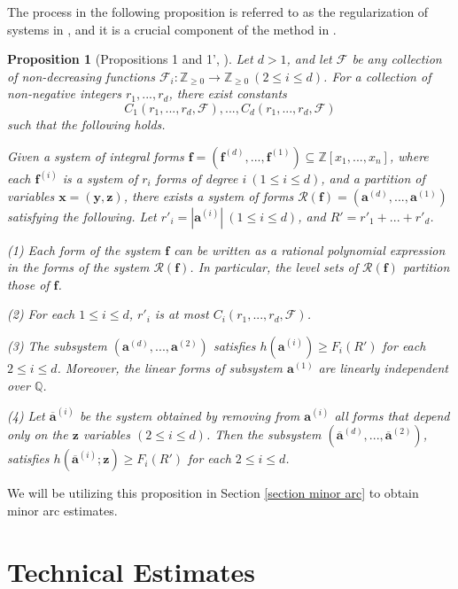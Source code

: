 \documentclass[12pt]{amsart}
\newtheorem{prop}[thm]{Proposition}
\theoremstyle{definition}
\theoremstyle{remark}
\numberwithin{equation}{section}
\begin{document}
The process in the following proposition is referred to as the regularization of systems in \cite{CM}, and it
is a crucial component of the method in \cite{CM}. 
\begin{prop}[Propositions 1 and 1', \cite{CM}]
\label{prop reg par}
Let $d>1$, and let $\boldsymbol{\mathcal{F}}$ be any collection of non-decreasing functions $\mathcal{F}_i: \mathbb{Z}_{\geq 0} \rightarrow \mathbb{Z}_{\geq 0} \ (2 \leq i \leq d)$. For a collection of non-negative integers $r_1, ..., r_d$, there exist constants
$$
C_1(r_1, ..., r_d, \boldsymbol{\mathcal{F}} ), ... , C_d(r_1, ..., r_d,  \boldsymbol{\mathcal{F}} )
$$
such that the following holds.

Given a system of integral forms $\mathbf{f} = ({\mathbf{f}}^{(d)}, ..., {\mathbf{f}}^{(1)}) \subseteq \mathbb{Z}[x_1, ..., x_n]$, where each
$\mathbf{f}^{(i)}$ is a system of $r_i$ forms of degree $i \ (1 \leq i \leq d)$, and a partition of variables $\mathbf{x} = (\mathbf{y}, \mathbf{z})$, there exists a system of forms
$\mathcal{R}( \mathbf{f}) = ({\mathbf{a}}^{(d)}, ..., {\mathbf{a}}^{(1)})$ satisfying the following.
Let $r'_i = |\mathbf{a}^{(i)}| \ (1 \leq i \leq d)$, and $R' = r'_1 + ... + r'_d$.
\newline

(1) Each form of the system $\mathbf{f}$ can be written as a rational polynomial expression in the forms of the system $\mathcal{R}( \mathbf{f})$.
In particular, the level sets of $\mathcal{R}( \mathbf{f})$ partition those of $\mathbf{f}$.

(2) For each $1 \leq i \leq d$, $r'_i$ is at most $C_i(r_1, ..., r_d, \boldsymbol{\mathcal{F}})$.

(3) The subsystem $({\mathbf{a}}^{(d)}, ..., { \mathbf{a} }^{(2)})$ satisfies $h({\mathbf{a}}^{(i)}) \geq F_i(R')$ for each $2 \leq i \leq d$. Moreover, the linear forms of subsystem ${ \mathbf{a} }^{(1)}$ are linearly independent over $\mathbb{Q}$.

(4) Let $\overline{\mathbf{a}}^{(i)}$ be the system obtained by removing from ${\mathbf{a}}^{(i)}$ all forms that depend only
on the $\mathbf{z}$ variables $(2 \leq i \leq d)$. Then the subsystem $({ \overline{\mathbf{a}}}^{(d)}, ..., { \overline{\mathbf{a}} }^{(2)})$,
satisfies $h({\overline{\mathbf{a}} }^{(i)} ; \mathbf{z}) \geq F_i(R')$ for each $2 \leq i \leq d$.
\end{prop}
We will be utilizing this proposition 
in Section \ref{section minor arc} to obtain minor arc estimates.

\section{Technical Estimates}
\label{technical estimate}
\end{document}
